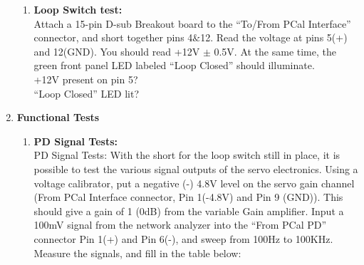 \begin{enumerate}
\begin{enumerate}
		\item \textbf{Loop Switch test:}\\
		Attach a 15-pin D-sub Breakout board to the “To/From PCal Interface” connector, and short together pins 4$\&$12. Read the voltage at pins 5(+) and 12(GND). You should read +12V $\pm$ 0.5V. At the same time, the green front panel LED labeled “Loop Closed” should illuminate.\\
		+12V present on pin 5?\underline{\qquad\qquad}\\
		“Loop Closed” LED lit?\underline{\qquad\qquad}\\
		
	\end{enumerate}
	\item \textbf{Functional Tests}
	\begin{enumerate}
		\item \textbf{PD Signal Tests:}\\
		PD Signal Tests: With the short for the loop switch still in place, it is possible to test the various signal outputs of the servo electronics. Using a voltage calibrator, put a negative (-) 4.8V level on the servo gain channel (From PCal Interface connector, Pin 1(-4.8V) and Pin 9 (GND)). This should give a gain of 1 (0dB) from the variable Gain amplifier. Input a 100mV signal from the network analyzer into the “From PCal PD” connector Pin 1(+) and Pin 6(-), and sweep from 100Hz to 100KHz. Measure the signals, and fill in the table below:
		\begin{center}
\end{center}
\end{enumerate}
\end{enumerate}
